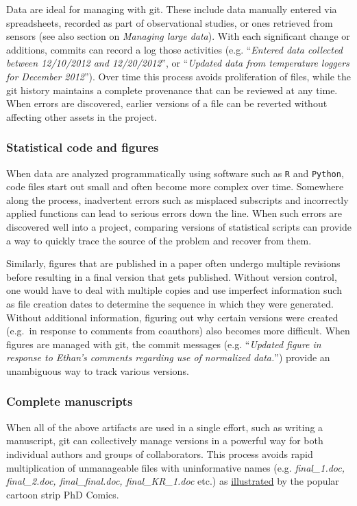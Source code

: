 \documentclass[]{article}
\begin{document}
Data are ideal for managing with git. These include data manually
entered via spreadsheets, recorded as part of observational studies, or
ones retrieved from sensors (see also section on \emph{Managing large
data}). With each significant change or additions, commits can record a
log those activities (e.g. ``\emph{Entered data collected between
12/10/2012 and 12/20/2012}'', or ``\emph{Updated data from temperature
loggers for December 2012}''). Over time this process avoids
proliferation of files, while the git history maintains a complete
provenance that can be reviewed at any time. When errors are discovered,
earlier versions of a file can be reverted without affecting other
assets in the project.

\subsubsection{Statistical code and figures}

When data are analyzed programmatically using software such as
\texttt{R} and \texttt{Python}, code files start out small and often
become more complex over time. Somewhere along the process, inadvertent
errors such as misplaced subscripts and incorrectly applied functions
can lead to serious errors down the line. When such errors are
discovered well into a project, comparing versions of statistical
scripts can provide a way to quickly trace the source of the problem and
recover from them.

Similarly, figures that are published in a paper often undergo multiple
revisions before resulting in a final version that gets published.
Without version control, one would have to deal with multiple copies and
use imperfect information such as file creation dates to determine the
sequence in which they were generated. Without additional information,
figuring out why certain versions were created (e.g.~in response to
comments from coauthors) also becomes more difficult. When figures are
managed with git, the commit messages (e.g. ``\emph{Updated figure in
response to Ethan's comments regarding use of normalized data.}'')
provide an unambiguous way to track various versions.

\subsubsection{Complete manuscripts}

When all of the above artifacts are used in a single effort, such as
writing a manuscript, git can collectively manage versions in a powerful
way for both individual authors and groups of collaborators. This
process avoids rapid multiplication of unmanageable files with
uninformative names (e.g. \emph{final\_1.doc, final\_2.doc,
final\_final.doc, final\_KR\_1.doc} etc.) as
\href{http://www.phdcomics.com/comics/archive.php?comicid=1531}{illustrated}
by the popular cartoon strip PhD Comics.
\end{document}
